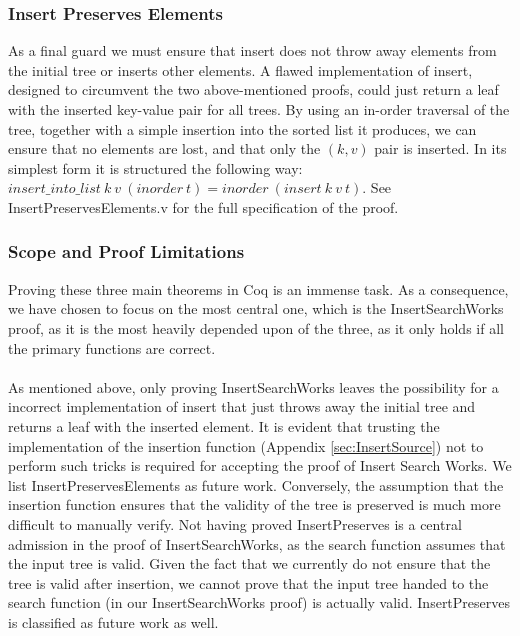 \subsubsection{Insert Preserves Elements}
As a final guard we must ensure that insert does not throw away elements from the initial tree or inserts other elements. A flawed implementation of insert, designed to circumvent the two above-mentioned proofs, could just return a leaf with the inserted key-value pair for all trees. By using an in-order traversal of the tree, together with a simple insertion into the sorted list it produces, we can ensure that no elements are lost, and that only the $(k, v)$ pair is inserted. In its simplest form it is structured the following way: $insert\_into\_list\ k\ v\ (inorder\ t) = inorder\ (insert\ k\ v\ t)$. See InsertPreservesElements.v for the full specification of the proof.

\subsubsection{Scope and Proof Limitations}
Proving these three main theorems in Coq is an immense task. As a consequence, we have chosen to focus on the most central one, which is the InsertSearchWorks proof, as it is the most heavily depended upon of the three, as it only holds if all the primary functions are correct.

\paragraph{}
As mentioned above, only proving InsertSearchWorks leaves the possibility for a incorrect implementation of insert that just throws away the initial tree and returns a leaf with the inserted element. It is evident that trusting the implementation of the insertion function (Appendix \ref{sec:InsertSource}) not to perform such tricks is required for accepting the proof of Insert Search Works. We list InsertPreservesElements as future work. Conversely, the assumption that the insertion function ensures that the validity of the tree is preserved is much more difficult to manually verify. Not having proved InsertPreserves is a central admission in the proof of InsertSearchWorks, as the search function assumes that the input tree is valid. Given the fact that we currently do not ensure that the tree is valid after insertion, we cannot prove that the input tree handed to the search function (in our InsertSearchWorks proof) is actually valid. InsertPreserves is classified as future work as well.
